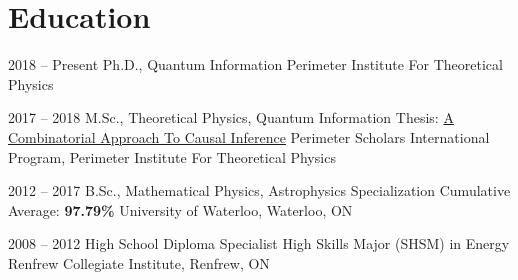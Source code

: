 \documentclass{article}
\begin{document}

    \section{Education}
    \begin{educationlist}
        \item{2018 -- Present}
            {Ph.D., Quantum Information}
            {}
            {Perimeter Institute For Theoretical Physics}
        \item{2017 -- 2018}
            {M.Sc., Theoretical Physics, Quantum Information}
            {Thesis: \href{https://github.com/tcfraser/combinatorial_causality/blob/master/thomas_fraser_thesis.pdf}{A Combinatorial Approach To Causal Inference}}
            {Perimeter Scholars International Program, Perimeter Institute For Theoretical Physics}
        \item{2012 -- 2017}
            {B.Sc., Mathematical Physics, Astrophysics Specialization}
            {Cumulative Average: \textbf{97.79\%}}
            {University of Waterloo, Waterloo, ON}
        \item{2008 -- 2012}
            {High School Diploma}
            {Specialist High Skills Major (SHSM) in Energy}
            {Renfrew Collegiate Institute, Renfrew, ON}
    \end{educationlist}
\end{document}
